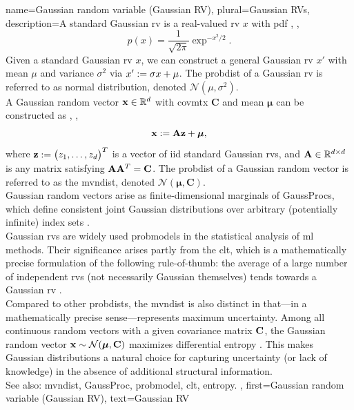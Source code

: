 {name={Gaussian random variable (Gaussian RV)}, 
	plural={Gaussian RVs}, 
	description={A  standard Gaussian \gls{rv} is a 
		real-valued \gls{rv} $x$ with \gls{pdf} \cite{BertsekasProb}, \cite{GrayProbBook}, \cite{papoulis}
		\begin{equation}
			\nonumber
			p(x) = \frac{1}{\sqrt{2\pi}} \exp^{-x^2/2}. 
		\end{equation}
		Given a standard Gaussian \gls{rv} $x$, we can construct a general Gaussian \gls{rv} $x'$ with 
		\gls{mean} $\mu$ and \gls{variance} $\sigma^2$ via $x' := \sigma x + \mu$. The \gls{probdist} of a 
		Gaussian \gls{rv} is referred to as normal distribution, denoted $\mathcal{N}(\mu, \sigma^2)$. 
		\\ 
		A Gaussian random vector ${\bf x} \in \mathbb{R}^{d}$ with 
		\gls{covmtx} $\mathbf{C}$ and \gls{mean} ${\bm \mu}$ can be constructed as \cite{GrayProbBook}, \cite{papoulis}, \cite{Lapidoth09}
		\[
		{\bf x} := \mathbf{A} {\bf z} + {\bm \mu},
		\]
		where ${\bf z} := \big( z_{1}, \ldots, z_{d} \big)^{T}$ is a vector of \gls{iid} standard Gaussian \glspl{rv}, 
		and ${\bf A} \in \mathbb{R}^{d \times d}$ is any matrix satisfying ${\bf A} {\bf A}^{T} = {\bf C}$. 
		The \gls{probdist} of a 
		Gaussian random vector is referred to as the \gls{mvndist}, denoted $\mathcal{N}({\bm \mu}, \mathbf{C})$.
		\\
		Gaussian random vectors arise as finite-dimensional marginals of \glspl{GaussProc}, which define 
		consistent joint Gaussian distributions over arbitrary (potentially infinite) index sets \cite{Rasmussen2006Gaussian}. 
  		\\
        		Gaussian \glspl{rv} are widely used \glspl{probmodel} in the statistical analysis of 
        		\gls{ml} methods. Their significance arises partly from the \gls{clt}, which is a mathematically 
        		precise formulation of the following rule-of-thumb: the average of a large number of 
        		independent \glspl{rv} (not necessarily Gaussian themselves) tends towards a Gaussian \gls{rv} \cite{ross2013first}.
		\\ 
		Compared to other \glspl{probdist}, the \gls{mvndist} is also distinct in that—in a mathematically 
		precise sense—represents maximum uncertainty. Among all continuous random vectors with 
		a given covariance matrix ${\bf C}$, the Gaussian random vector ${\bf x} \sim \mathcal{N}({\bm \mu}, \mathbf{C})$ 
		maximizes differential \gls{entropy} \cite[Th. 8.6.5]{coverthomas}. This makes Gaussian distributions a 
		natural choice for capturing uncertainty (or lack of knowledge) in the absence of additional 
		structural information.
		\\ 
		See also: \gls{mvndist}, \gls{GaussProc}, \gls{probmodel}, \gls{clt}, \gls{entropy}.
	},
	first={Gaussian random variable (Gaussian RV)},
	text={Gaussian RV}}
	
